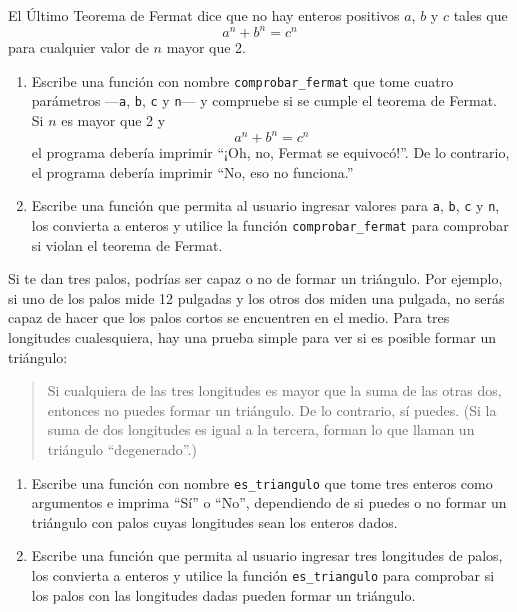 \documentclass[10pt]{book}
\begin{document}
\begin{exercise}

El Último Teorema de Fermat dice que no hay enteros positivos
$a$, $b$ y $c$ tales que
\[ a^n + b^n = c^n \]
%
para cualquier valor de $n$ mayor que 2.

\begin{enumerate}

\item Escribe una función con nombre \verb"comprobar_fermat" que tome cuatro
parámetros ---{\tt a}, {\tt b}, {\tt c} y {\tt n}--- y
compruebe si se cumple el teorema de Fermat.  Si
$n$ es mayor que 2 y
\[a^n + b^n = c^n \]
%
el programa debería imprimir ``¡Oh, no, Fermat se equivocó!''.
De lo contrario, el programa debería imprimir ``No, eso no funciona.''

\item Escribe una función que permita al usuario ingresar valores
para {\tt a}, {\tt b}, {\tt c} y {\tt n}, los convierta a
enteros y utilice la función \verb"comprobar_fermat" para comprobar si
violan el teorema de Fermat.

\end{enumerate}

\end{exercise}


\begin{exercise}

Si te dan tres palos, podrías ser capaz o no de formar
un triángulo.  Por ejemplo, si uno de los palos mide 12 pulgadas
y los otros dos miden una pulgada, no serás
capaz de hacer que los palos cortos se encuentren en el medio.  Para tres
longitudes cualesquiera, hay una prueba simple para ver si es posible formar
un triángulo:

\begin{quotation}
Si cualquiera de las tres longitudes es mayor que la suma de las otras
  dos, entonces no puedes formar un triángulo.  De lo contrario, sí
  puedes.  (Si la suma de dos longitudes es igual a la tercera, forman
    lo que llaman un triángulo ``degenerado''.)
\end{quotation}

\begin{enumerate}

\item Escribe una función con nombre \verb"es_triangulo" que tome tres
  enteros como argumentos e imprima ``Sí'' o ``No'', dependiendo
  de si puedes o no formar un triángulo con palos cuyas longitudes sean
  los enteros dados.

\item Escribe una función que permita al usuario ingresar tres longitudes de
  palos, los convierta a enteros y utilice la función \verb"es_triangulo" para
  comprobar si los palos con las longitudes dadas pueden formar un triángulo.

\end{enumerate}

\end{exercise}
\end{document}
